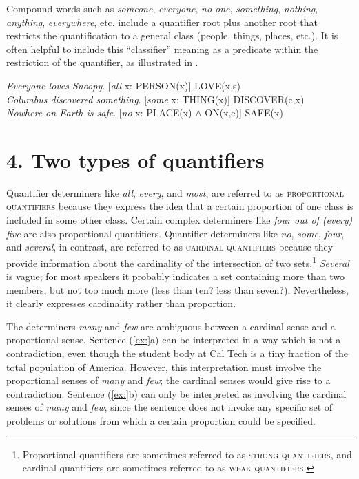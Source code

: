Compound words such as \textit{someone}, \textit{everyone}, \textit{no one}, \textit{something}, \textit{nothing}, \textit{anything}, \textit{everywhere}, etc. include a quantifier root plus another root that restricts the quantification to a general class (people, things, places, etc.). It is often helpful to include this “classifier” meaning as a predicate within the restriction of the quantifier, as illustrated in .


\ea
\ea \textit{Everyone loves Snoopy}.  [\textit{all} x: PERSON(x)] LOVE(x,s)\\
\ex \textit{Columbus discovered something}.  [\textit{some} x: THING(x)] DISCOVER(c,x)\\
\ex \textit{Nowhere on Earth is safe}.  [\textit{no} x: PLACE(x) $\wedge$ ON(x,e)] SAFE(x)
                       \z
\z

\section{4. Two types of quantifiers}\label{sec:}

Quantifier determiners like \textit{all}, \textit{every}, and \textit{most}, are referred to as \textsc{proportional quantifiers} because they express the idea that a certain proportion of one class is included in some other class. Certain complex determiners like \textit{four out of (every) five} are also proportional quantifiers. Quantifier determiners like \textit{no}, \textit{some}, \textit{four}, and \textit{several}, in contrast, are referred to as \textsc{cardinal quantifiers} because they provide information about the cardinality of the intersection of two sets.\footnote{Proportional quantifiers are sometimes referred to as \textsc{strong} \textsc{quantifiers}, and cardinal quantifiers are sometimes referred to as \textsc{weak} \textsc{quantifiers}.} \textit{Several} is vague; for most speakers it probably indicates a set containing more than two members, but not too much more (less than ten? less than seven?). Nevertheless, it clearly expresses cardinality rather than proportion.



The determiners \textit{many} and \textit{few} are ambiguous between a cardinal sense and a proportional sense. Sentence (\ref{ex:}a) can be interpreted in a way which is not a contradiction, even though the student body at Cal Tech is a tiny fraction of the total population of America. However, this interpretation must involve the proportional senses of \textit{many} and \textit{few}; the cardinal senses would give rise to a contradiction. Sentence (\ref{ex:}b) can only be interpreted as involving the cardinal senses of \textit{many} and \textit{few}, since the sentence does not invoke any specific set of problems or solutions from which a certain proportion could be specified.


